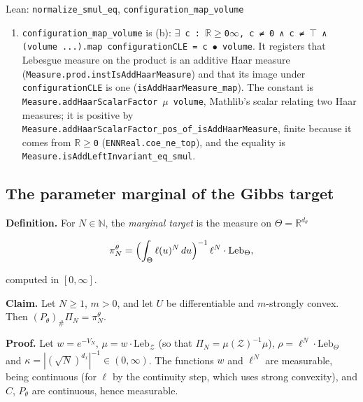 \documentclass[11pt,a4paper]{report}
\begin{document}
\begin{leanbox}{Lean: \texttt{normalize\_\allowbreak{}smul\_\allowbreak{}eq}, \texttt{configuration\_\allowbreak{}map\_\allowbreak{}volume}}
\begin{enumerate}
\item \texttt{configuration\_\allowbreak{}map\_\allowbreak{}volume} is (b): \texttt{\ensuremath{\exists} c : \ensuremath{\mathbb R}\ensuremath{\ge}0\ensuremath{\infty}, c ≠ 0 ∧ c ≠ \ensuremath{\top} ∧ (volume .\allowbreak{}.\allowbreak{}.\allowbreak{}).\allowbreak{}map configuration\allowbreak{}CLE = c \ensuremath{\bullet} volume}. It registers that Lebesgue measure on the product is an additive Haar measure (\texttt{Measure.\allowbreak{}prod.\allowbreak{}inst\allowbreak{}Is\allowbreak{}Add\allowbreak{}Haar\allowbreak{}Measure}) and that its image under \texttt{configuration\allowbreak{}CLE} is one (\texttt{is\allowbreak{}Add\allowbreak{}Haar\allowbreak{}Measure\_\allowbreak{}map}). The constant is \texttt{Measure.\allowbreak{}add\allowbreak{}Haar\allowbreak{}Scalar\allowbreak{}Factor \ensuremath{\mu} volume}, Mathlib's scalar relating two Haar measures; it is positive by \texttt{Measure.\allowbreak{}add\allowbreak{}Haar\allowbreak{}Scalar\allowbreak{}Factor\_\allowbreak{}pos\_\allowbreak{}of\_\allowbreak{}is\allowbreak{}Add\allowbreak{}Haar\allowbreak{}Measure}, finite because it comes from \texttt{\ensuremath{\mathbb R}\ensuremath{\ge}0} (\texttt{ENNReal.\allowbreak{}coe\_\allowbreak{}ne\_\allowbreak{}top}), and the equality is \texttt{Measure.\allowbreak{}is\allowbreak{}Add\allowbreak{}Left\allowbreak{}Invariant\_\allowbreak{}eq\_\allowbreak{}smul}.

\end{enumerate}
\end{leanbox}
\subsection{\texorpdfstring{The parameter marginal of the Gibbs target}{The parameter marginal of the Gibbs target}}
\label{report-step-IPLA-MarginalConcentration-lean-9}


\textbf{Definition.} For \(N\in\mathbb N\), the \emph{marginal target} is the measure on \(\Theta=\mathbb R^{d_\theta}\)


\[\pi_N^\theta=\Bigl(\int_\Theta\ell(u)^N\,du\Bigr)^{-1}\,\ell^N\cdot\mathrm{Leb}_\Theta,\]


computed in \([0,\infty]\).




\textbf{Claim.} Let \(N\ge1\), \(m>0\), and let \(U\) be differentiable and \(m\)-strongly convex. Then \((P_\theta)_\#\Pi_N=\pi_N^\theta\).




\textbf{Proof.} Let \(w=e^{-V_N}\), \(\mu=w\cdot\mathrm{Leb}_{\mathcal Z}\) (so that \(\Pi_N=\mu(\mathcal Z)^{-1}\mu\)), \(\rho=\ell^N\cdot\mathrm{Leb}_\Theta\) and \(\kappa=|(\sqrt N)^{d_x}|^{-1}\in(0,\infty)\). The functions \(w\) and \(\ell^N\) are measurable, being continuous (for \(\ell\) by the continuity step, which uses strong convexity), and \(C\), \(P_\theta\) are continuous, hence measurable.
\end{document}
